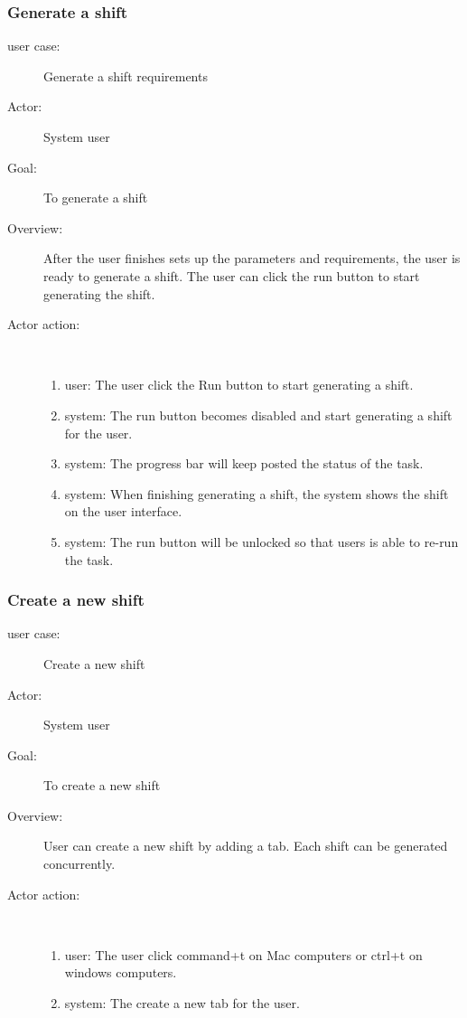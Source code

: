 \documentclass[11pt, oneside]{article}   	%
\begin{document}
\subsubsection{Generate a shift}
\begin{description}
\item[user case:] Generate a shift requirements
\item[Actor:] System user
\item[Goal:] To generate a shift
\item[Overview:]After the user finishes sets up the parameters and requirements, the user is ready to generate a shift. The user can click the run button to start generating the shift.
\item[Actor action:]
\
\begin{enumerate}
\item user: The user click the Run button to start generating a shift.
\item system: The run button becomes disabled and start generating a shift for the user.
\item system: The progress bar will keep posted the status of the task.
\item system: When finishing generating a shift, the system shows the shift on the user interface.
\item system: The run button will be unlocked so that users is able to re-run the task.
\end{enumerate}
\end{description}
\subsubsection{Create a new shift}
\begin{description}
\item[user case:] Create a new shift
\item[Actor:] System user
\item[Goal:] To create a new shift
\item[Overview:] User can create a new shift by adding a tab. Each shift can be generated concurrently. 
\item[Actor action:]
\
\begin{enumerate}
\item user: The user click command+t on Mac computers or ctrl+t on windows computers.
\item system: The create a new tab for the user.
\end{enumerate}
\end{description}
\end{document}
